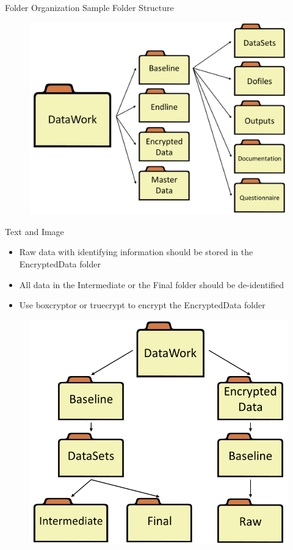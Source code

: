 \documentclass[aspectratio=169]{beamer}
\begin{document}
\begin{frame}{Folder Organization \newline Sample Folder Structure}
\begin{figure}
	\centering
	\includegraphics[width=\linewidth]{img/folderstructure}
\end{figure}
\end{frame}

\begin{frame}[fragile]{Text and Image}
\begin{multicols}{2}	
	\begin{itemize}
		\item Raw data with identifying information should be stored in the EncryptedData folder
		\item All data in the Intermediate or the Final folder should be de-identified
		\item Use boxcryptor or truecrypt to encrypt the EncryptedData folder
	\end{itemize}
	\begin{figure}
		\centering
		\includegraphics[width=\linewidth]{img/folderstructure2}
	\end{figure}
\end{multicols}
\end{frame}
\end{document}
